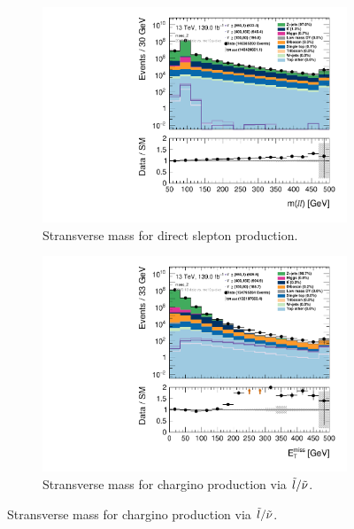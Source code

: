 \begin{figure}[H]
\centering
    \begin{subfigure}[t!]{0.49\textwidth}
        \includegraphics[width=\textwidth]{Figures/MonoZcuts/hist1d_mll_mono_Z.pdf}
    \caption{Stransverse mass for direct slepton production.}
    \label{fig:my_label}
    \end{subfigure}
    \begin{subfigure}[t!]{0.49\textwidth}
        \includegraphics[width=\textwidth]{Figures/MonoZcuts/hist1d_met_Et_mono_Z_1.pdf}
    \caption{Stransverse mass for chargino production via $\Tilde{l}/\Tilde{\nu}$.}

\end{subfigure}
\end{figure}
